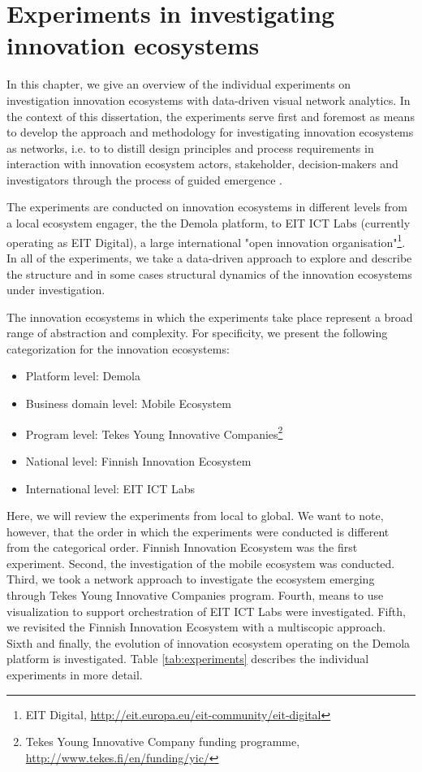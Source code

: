 \chapter{Experiments in investigating innovation ecosystems}
\label{ch:experiments}

In this chapter, we give an overview of the individual experiments on investigation innovation ecosystems with data-driven visual network analytics. In the context of this dissertation, the experiments serve first and foremost as means to develop the approach and methodology for investigating innovation ecosystems as networks, i.e. to to distill design principles and process requirements in interaction with innovation ecosystem actors, stakeholder, decision-makers and investigators through the process of guided emergence \citep[cf.][]{Sein2011ActionResearch}.

The experiments are conducted on innovation ecosystems in different levels from a local ecosystem engager, the the Demola platform, to EIT ICT Labs (currently operating as EIT Digital), a large international "open innovation organisation"\footnote{EIT Digital, \url{http://eit.europa.eu/eit-community/eit-digital}}. In all of the experiments, we take a data-driven approach to explore and describe the structure and in some cases structural dynamics of the innovation ecosystems under investigation.

The innovation ecosystems in which the experiments take place represent a broad range of abstraction and complexity. For specificity, we present the following categorization for the innovation ecosystems:

\begin{itemize} 
  \item Platform level: Demola
  \item Business domain level: Mobile Ecosystem 
  \item Program level: Tekes Young Innovative Companies\footnote{Tekes Young Innovative Company funding programme, \url{http://www.tekes.fi/en/funding/yic/}}
  \item National level: Finnish Innovation Ecosystem
  \item International level: EIT ICT Labs
\end{itemize}

Here, we will review the experiments from local to global. We want to note, however, that the order in which the experiments were conducted is different from the categorical order. Finnish Innovation Ecosystem was the first experiment. Second, the investigation of the mobile ecosystem was conducted. Third, we took a network approach to investigate the ecosystem emerging through Tekes Young Innovative Companies program. Fourth, means to use visualization to support orchestration of EIT ICT Labs were investigated. Fifth, we revisited the Finnish Innovation Ecosystem with a multiscopic approach. Sixth and finally, the evolution of innovation ecosystem operating on the Demola platform is investigated. Table \ref{tab:experiments} describes the individual experiments in more detail.
 
